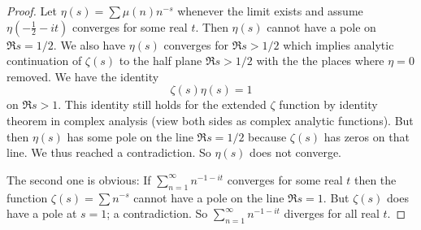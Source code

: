 \documentclass[12pt]{article}
\begin{document}
\begin{proof}
Let $\eta(s) = \sum \mu(n) n^{-s}$ whenever the limit exists and assume $\eta(-\frac12 - it)$ converges for some real $t$. Then $\eta(s)$ cannot have a pole on $\Re s = 1/2$. We also have $\eta(s)$ converges for $\Re s > 1/2$ which implies analytic continuation of $\zeta(s)$ to the half plane $\Re s > 1/2$ with the the places where $\eta = 0$ removed. We have the identity
$$\zeta(s) \eta(s) = 1$$
on $\Re s > 1$. This identity still holds for the extended $\zeta$ function by identity theorem in complex analysis (view both sides as complex analytic functions). But then $\eta(s)$ has some pole on the line $\Re s = 1/2$ because $\zeta(s)$ has zeros on that line. We thus reached a contradiction. So $\eta(s)$ does not converge.

The second one is obvious: If $\sum_{n=1}^{\infty} n^{-1 - it}$ converges for some real $t$ then the function $\zeta(s) = \sum n^{-s}$ cannot have a pole on the line $\Re s = 1$. But $\zeta(s)$ does have a pole at $s = 1$; a contradiction. So $\sum_{n=1}^{\infty} n^{-1 - it}$ diverges for all real $t$.
\end{proof}

\unless\ifdefined\IsMainDocument
\end{document}
